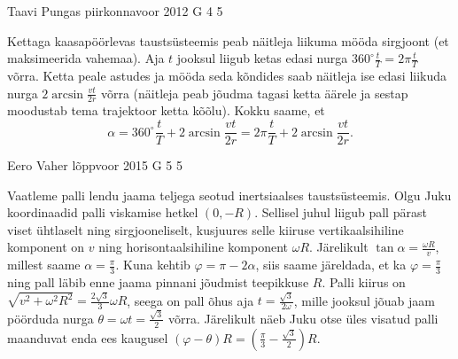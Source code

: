 \documentclass[11pt, twoside]{article}
\begin{document}
{%
{Taavi Pungas} %
{piirkonnavoor} %
{2012} %
{G 4} %
{5} %
{

\ifSolution
Kettaga kaasapöörlevas taustsüsteemis peab näitleja liikuma mööda sirgjoont (et maksimeerida vahemaa).
Aja $t$ jooksul liigub ketas edasi nurga $360^\circ\frac{t}{T}=2\pi\frac{t}{T}$ võrra. Ketta peale astudes ja mööda seda kõndides saab näitleja ise edasi liikuda nurga $2\arcsin\frac{vt}{2r}$ võrra (näitleja peab jõudma tagasi ketta äärele ja sestap moodustab tema trajektoor ketta kõõlu). Kokku saame, et 
$$\alpha=360^\circ\frac{t}{T}+2\arcsin\frac{vt}{2r}=2\pi\frac{t}{T}+2\arcsin\frac{vt}{2r}.$$
\fi
}

{Eero Vaher} %
{lõppvoor} %
{2015} %
{G 5} %
{5} %
{

\ifSolution
Vaatleme palli lendu jaama teljega seotud inertsiaalses taustsüsteemis. Olgu Juku koordinaadid palli viskamise hetkel $(0,-R)$. Sellisel juhul liigub pall pärast viset ühtlaselt ning sirgjooneliselt, kusjuures selle kiiruse vertikaalsihiline komponent on $v$ ning horisontaalsihiline komponent $\omega R$. Järelikult $\tan\alpha=\frac{\omega R}{v}$, millest saame $\alpha=\frac{\pi}{3}$. Kuna kehtib $\varphi=\pi-2\alpha$, siis saame järeldada, et ka $\varphi=\frac{\pi}{3}$ ning pall läbib enne jaama pinnani jõudmist teepikkuse $R$. Palli kiirus on $\sqrt{v^2+\omega^2R^2}=\frac{2\sqrt{3}}{3}\omega R$, seega on pall õhus aja $t=\frac{\sqrt{3}}{2\omega}$, mille jooksul jõuab jaam pöörduda nurga $\theta=\omega t=\frac{\sqrt{3}}{2}$ võrra. Järelikult näeb Juku otse üles visatud palli maanduvat enda ees kaugusel $\left(\varphi-\theta\right)R=\left(\frac{\pi}{3}-\frac{\sqrt{3}}{2}\right)R$.

\begin{center}
\end{center}
\fi
}

}
\end{document}
